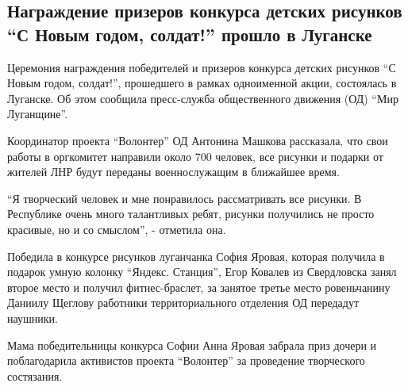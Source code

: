  
 
 
 
 
\subsection{Награждение призеров конкурса детских рисунков \enquote{С Новым годом, солдат!} прошло в Луганске}
\label{sec:28_12_2021.stz.news.lnr.lug_info.1.deti_konkurs_ny_soldat}


Церемония награждения победителей и призеров конкурса детских рисунков \enquote{С Новым
годом, солдат!}, прошедшего в рамках одноименной акции, состоялась в Луганске.
Об этом сообщила пресс-служба общественного движения (ОД) \enquote{Мир Луганщине}.


Координатор проекта \enquote{Волонтер} ОД Антонина Машкова рассказала, что свои работы
в оргкомитет направили около 700 человек, все рисунки и подарки от жителей ЛНР
будут переданы военнослужащим в ближайшее время.


\enquote{Я творческий человек и мне понравилось рассматривать все рисунки. В Республике
очень много талантливых ребят, рисунки получились не просто красивые, но и со
смыслом}, - отметила она.

Победила в конкурсе рисунков луганчанка София Яровая, которая получила в
подарок умную колонку \enquote{Яндекс. Станция}, Егор Ковалев из Свердловска занял
второе место и получил фитнес-браслет, за занятое третье место ровеньчанину
Даниилу Щеглову работники территориального отделения ОД передадут наушники.

Мама победительницы конкурса Софии Анна Яровая забрала приз дочери и
поблагодарила активистов проекта \enquote{Волонтер} за проведение творческого
состязания.

